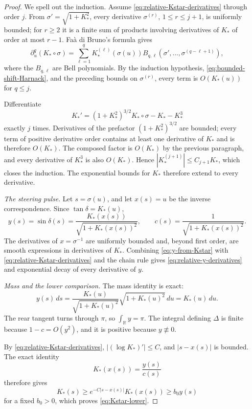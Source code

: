 \documentclass[11pt]{article}
\theoremstyle{remark}
\newcommand{\R}{\mathbb R}
\begin{document}
\begin{proof}
We spell out the induction.  Assume
\eqref{eq:relative-Kstar-derivatives} through order \(j\).  From
\(\sigma'=\sqrt{1+K_*^2}\), every derivative \(\sigma^{(r)}\),
\(1\leq r\leq j+1\), is uniformly bounded; for \(r\geq2\) it is a finite
sum of products involving derivatives of \(K_*\) of order at most
\(r-1\).  Fa\`a di Bruno's formula gives
\[
 \partial_u^q(K_*\circ\sigma)
 =\sum_{\ell=1}^q
   K_*^{(\ell)}(\sigma(u))
   B_{q,\ell}(\sigma',\ldots,\sigma^{(q-\ell+1)}),
\]
where the \(B_{q,\ell}\) are Bell polynomials.  By the induction
hypothesis, \eqref{eq:bounded-shift-Harnack}, and the preceding bounds on
\(\sigma^{(r)}\), every term is \(O(K_*(u))\) for \(q\leq j\).

Differentiate
\[
   K_*'
   =(1+K_*^2)^{3/2}K_*\circ\sigma-K_*-K_*^3
\]
exactly \(j\) times.  Derivatives of the prefactor
\((1+K_*^2)^{3/2}\) are bounded; every term of positive derivative order
contains at least one derivative of \(K_*\) and is therefore
\(O(K_*)\).  The composed factor is \(O(K_*)\) by the previous paragraph,
and every derivative of \(K_*^3\) is also \(O(K_*)\).  Hence
\(|K_*^{(j+1)}|\leq C_{j+1}K_*\), which closes the induction.  The
exponential bounds for \(K_*\) therefore extend to every derivative.

\emph{The steering pulse.}
Let \(s=\sigma(u)\), and let \(x(s)=u\) be the inverse correspondence.
Since \(\tan\delta=K_*(u)\),
\begin{equation}\label{eq:y-from-Kstar}
   y(s)=\sin\delta(s)
       =\frac{K_*(x(s))}{\sqrt{1+K_*(x(s))^2}},
   \qquad
   c(s)=\frac1{\sqrt{1+K_*(x(s))^2}}.
\end{equation}
The derivatives of \(x=\sigma^{-1}\) are uniformly bounded and, beyond
first order, are smooth expressions in derivatives of \(K_*\).  Combining
\eqref{eq:y-from-Kstar} with
\eqref{eq:relative-Kstar-derivatives} and the chain rule gives
\eqref{eq:relative-y-derivatives} and exponential decay of every derivative
of \(y\).

\emph{Mass and the lower comparison.}
The mass identity is exact:
\[
   y(s)\,ds
   =\frac{K_*(u)}{\sqrt{1+K_*(u)^2}}
      \sqrt{1+K_*(u)^2}\,du
   =K_*(u)\,du.
\]
The rear tangent turns through \(\pi\), so \(\int_\R y=\pi\).  The
integral defining \(\Delta\) is finite because
\(1-c=O(y^2)\), and it is positive because \(y\not\equiv0\).

By \eqref{eq:relative-Kstar-derivatives}, \(|(\log K_*)'|\leq C\), and
\(|s-x(s)|\) is bounded.  The exact identity
\[
   K_*(x(s))=\frac{y(s)}{c(s)}
\]
therefore gives
\[
   K_*(s)\geq e^{-C|s-x(s)|}K_*(x(s))
       \geq b_0y(s)
\]
for a fixed \(b_0>0\), which proves \eqref{eq:Kstar-lower}.
\end{proof}
\end{document}
